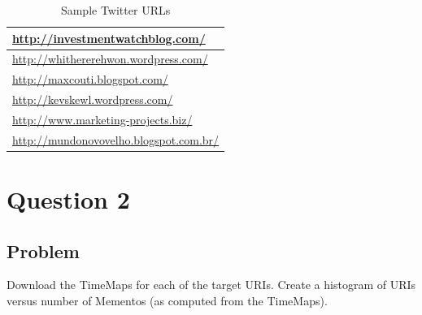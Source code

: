 \documentclass[letterpaper,11pt]{report}
\begin{document}
\begin{savenotes}
\begin{table}[htbp]
	\centering
    \begin{tabular}{l}
		\hline
    \url{http://investmentwatchblog.com/ }       \\ \hline
    \url{http://whithererehwon.wordpress.com/}   \\ \hline
    \url{http://maxcouti.blogspot.com/}          \\ \hline
    \url{http://kevskewl.wordpress.com/}         \\ \hline
    \url{http://www.marketing-projects.biz/}     \\ \hline
    \url{http://mundonovovelho.blogspot.com.br/} \\ \hline
    \end{tabular}
		\caption{Sample Twitter URLs}
		\label{tab:SampleTwitterURLs}
\end{table}


\section{Question 2}
\subsection{Problem}Download the TimeMaps for each of the target URIs. Create a histogram of URIs versus number of Mementos (as computed from the TimeMaps).

\end{savenotes}
\end{document}
